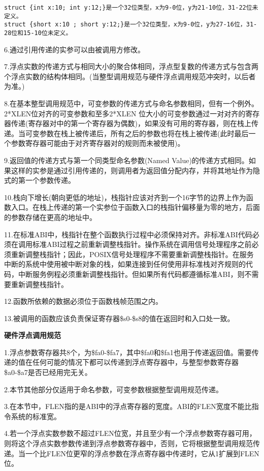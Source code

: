 \documentclass[]{ctexbook}
\begin{document}
\begin{verbatim}
struct {int x:10; int y:12;}是一个32位类型，x为9-0位，y为21-10位，31-22位未定义。
struct {short x:10 ; short y:12;}是一个32位类型，x为9-0位，y为27-16位，31-28位和15-10位未定义。
\end{verbatim}

6.通过引用传递的实参可以由被调用方修改。

7.浮点实数的传递方式与相同大小的聚合体相同，浮点型复数的传递方式与包含两个浮点实数的结构体相同。(当整型调用规范与硬件浮点调用规范冲突时，以后者为准。)

8.在基本整型调用规范中，可变参数的传递方式与命名参数相同，但有一个例外。2*XLEN位对齐的可变参数和至多2*XLEN 位大小的可变参数通过一对对齐的寄存器传递(寄存器对中的第一个寄存器为偶数)，如果没有可用的寄存器，则在栈上传递。当可变参数在栈上被传递后，所有之后的参数也将在栈上被传递(此时最后一个参数寄存器可能由于对齐寄存器对的规则而未被使用)。

9.返回值的传递方式与第一个同类型命名参数(Named Value)的传递方式相同。如果这样的实参是通过引用传递的，则调用者为返回值分配内存，并将其地址作为隐式的第一个参数传递。

10.栈向下增长(朝向更低的地址)，栈指针应该对齐到一个16字节的边界上作为函数入口。在栈上传递的第一个实参位于函数入口的栈指针偏移量为零的地方，后面的参数存储在更高的地址中。

11.在标准ABI中，栈指针在整个函数执行过程中必须保持对齐。非标准ABI代码必须在调用标准ABI过程之前重新调整栈指针。操作系统在调用信号处理程序之前必须重新调整栈指针；因此，POSIX信号处理程序不需要重新调整栈指针。在服务中断的系统中使用被中断对象的栈，如果连接到任何使用非标准栈对齐规则的代码，中断服务例程必须重新调整栈指针。但如果所有代码都遵循标准ABI，则不需要重新调整栈指针。

12.函数所依赖的数据必须位于函数栈帧范围之内。

13.被调用的函数应该负责保证寄存器\$s0-\$s8的值在返回时和入口处一致。

\textbf{硬件浮点调用规范}

1.浮点参数寄存器共8个，为\$fa0-\$fa7，其中\$fa0和\$fa1也用于传递返回值。需要传递的值在任何可能的情况下都可以传递到浮点寄存器中，与整型参数寄存器\$a0-\$a7是否已经用完无关。

2.本节其他部分仅适用于命名参数，可变参数根据整型调用规范传递。

3.在本节中，FLEN指的是ABI中的浮点寄存器的宽度。ABI的FLEN宽度不能比指令系统的标准宽。

4.若一个浮点实数参数不超过FLEN位宽，并且至少有一个浮点参数寄存器可用，则将这个浮点实数参数传递到浮点参数寄存器中，否则，它将根据整型调用规范传递。当一个比FLEN位更窄的浮点参数在浮点寄存器中传递时，它从1扩展到FLEN位。
\end{document}

